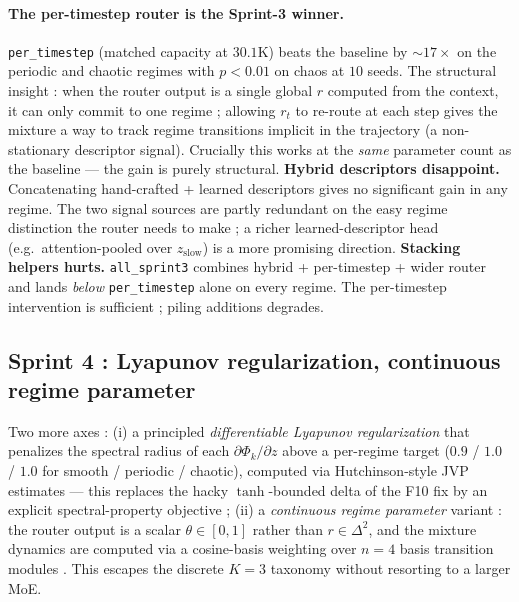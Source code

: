 \documentclass[11pt,a4paper]{article}
\begin{document}
\paragraph{The per-timestep router is the Sprint-3 winner.}
\texttt{per\_timestep} (matched capacity at $30.1$K) beats the
baseline by $\sim 17{\times}$ on the periodic and chaotic regimes
with $p{<}0.01$ on chaos at $10$ seeds. The structural insight :
when the router output is a single global $r$ computed from the
context, it can only commit to one regime ; allowing $r_t$ to
re-route at each step gives the mixture a way to track regime
transitions implicit in the trajectory (a non-stationary
descriptor signal). Crucially this works at the \emph{same}
parameter count as the baseline --- the gain is purely structural.
\textbf{Hybrid descriptors disappoint.} Concatenating hand-crafted
+ learned descriptors gives no significant gain in any regime. The
two signal sources are partly redundant on the easy regime
distinction the router needs to make ; a richer learned-descriptor
head (e.g.\ attention-pooled over $z_{\text{slow}}$) is a more
promising direction.
\textbf{Stacking helpers hurts.} \texttt{all\_sprint3} combines
hybrid + per-timestep + wider router and lands \emph{below}
\texttt{per\_timestep} alone on every regime. The per-timestep
intervention is sufficient ; piling additions degrades.

\subsection{Sprint 4 : Lyapunov regularization, continuous regime parameter}
\label{sec:rwm-sprint4}

Two more axes : (i) a principled \emph{differentiable Lyapunov
regularization} that penalizes the spectral radius of each
$\partial \Phi_k / \partial z$ above a per-regime target ($0.9$ /
$1.0$ / $1.0$ for smooth / periodic / chaotic), computed via
Hutchinson-style JVP estimates --- this replaces the hacky
$\tanh$-bounded delta of the F10 fix by an explicit
spectral-property objective ; (ii) a \emph{continuous regime
parameter} variant : the router output is a scalar
$\theta \in [0, 1]$ rather than $r \in \Delta^2$, and the mixture
dynamics are computed via a cosine-basis weighting over $n=4$
basis transition modules \cite{koopman1931,lusch2018dkr}. This
escapes the discrete $K{=}3$ taxonomy without resorting to a
larger MoE.
\end{document}

